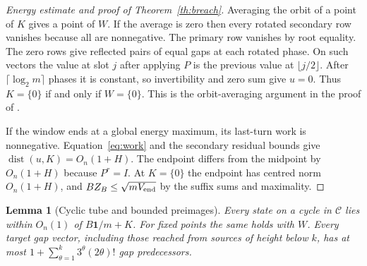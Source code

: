 \documentclass[11pt]{amsart}
\newtheorem{lemma}[theorem]{Lemma}
\theoremstyle{definition}
\DeclareMathOperator{\dist}{dist}
\newcommand{\one}{\mathbf 1}
\newcommand{\C}{\mathcal C}
\begin{document}
\begin{proof}[Energy estimate and proof of Theorem~\ref{th:breach}]
Averaging the orbit of a point of \(K\) gives a point of \(W\).
If the average is zero then every rotated secondary row vanishes
because all are nonnegative. The primary row vanishes by root equality.
The zero rows give reflected pairs of equal gaps at each rotated phase.
On such vectors the value at slot \(j\) after applying \(P\)
is the previous value at \(\lfloor j/2\rfloor\). After
\(\lceil\log_2m\rceil\) phases it is constant, so invertibility
and zero sum give \(u=0\). Thus \(K=\{0\}\) if and only if
\(W=\{0\}\). This is the orbit-averaging argument in the proof of
\cite[Theorem~1]{G10}.

If the window ends at a global energy maximum, its last-turn work
is nonnegative. Equation~\eqref{eq:work} and the secondary residual
bounds give \(\dist(u,K)=O_n(1+H)\). The endpoint differs
from the midpoint by \(O_n(1+H)\) because \(P^r=I\).
At \(K=\{0\}\) the endpoint has centred norm \(O_n(1+H)\),
and \(BZ_B\le \sqrt{mV_{\rm end}}\) by the suffix sums and maximality.
\end{proof}

\begin{lemma}[Cyclic tube and bounded preimages]\label{lem:tube}
Every state on a cycle in \(\C\) lies within \(O_n(1)\) of
\(B\one/m+K\). For fixed points the same holds with \(W\).
Every target gap vector, including those reached from sources of
height below \(k\), has at most
\(1+\sum_{\theta=1}^k3^\theta(2\theta)!\) gap predecessors.
\end{lemma}
\end{document}
